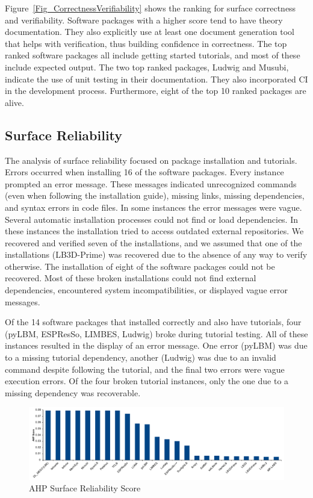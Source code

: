 \documentclass[final, 3p, times, authoryear]{elsarticle}
\newcommand{\esp}{ESPResSo\nolinebreak\hspace{-.05em}\raisebox{.4ex}{\small\bf
+}\nolinebreak\hspace{-.10em}\raisebox{.4ex}{\small\bf +}}
\begin{document}
Figure~\ref{Fig_CorrectnessVerifiability} shows the ranking for surface
correctness and verifiability. Software packages with a higher score tend to
have theory documentation. They also explicitly use at least one document
generation tool that helps with verification, thus building confidence in
correctness. The top ranked software packages all include getting started
tutorials, and most of these include expected output. The two top ranked
packages, Ludwig and Musubi, indicate the use of unit testing in their
documentation. They also incorporated CI in the development process.
Furthermore, eight of the top 10 ranked packages are alive.

\subsection{Surface Reliability}

The analysis of surface reliability focused on package installation and
tutorials. Errors occurred when installing 16 of the software packages. Every
instance prompted an error message. These messages indicated unrecognized
commands (even when following the installation guide), missing links, missing
dependencies, and syntax errors in code files. In some instances the error
messages were vague. Several automatic installation processes could not find or
load dependencies. In these instances the installation tried to access outdated
external repositories. We recovered and verified seven of the installations,
and we assumed that one of the installations (LB3D-Prime) was recovered due to the
absence of any way to verify otherwise. The installation of eight of the software
packages could not be recovered. Most of these broken installations could not
find external dependencies, encountered system incompatibilities, or displayed
vague error messages.

Of the 14 software packages that installed correctly and also have tutorials,
four (pyLBM, \esp, LIMBES, Ludwig) broke during tutorial testing. All of these
instances resulted in the display of an error message. One error (pyLBM) was due
to a missing tutorial dependency, another (Ludwig) was due to an invalid command
despite following the tutorial, and the final two errors were vague execution
errors. Of the four broken tutorial instances, only the one due to a missing
dependency was recoverable. 

\begin{figure}[h!]
	\begin{center}
		\includegraphics[width=1.0\textwidth]{./figures/reliability_chart.pdf}
		\caption{AHP Surface Reliability Score}
		\label{Fig_Reliability}
	\end{center}
\end{figure}
\end{document}
